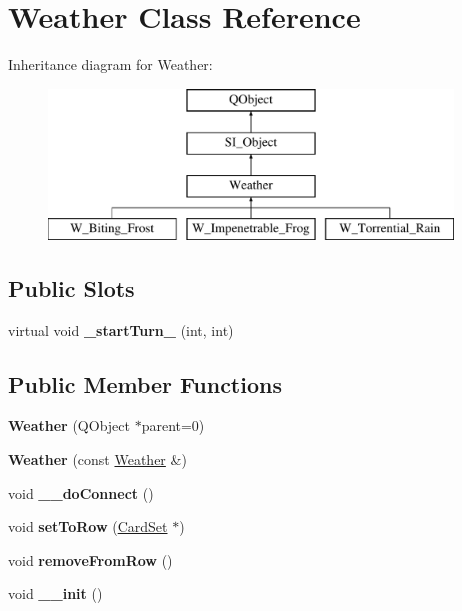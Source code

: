 \hypertarget{class_weather}{}\section{Weather Class Reference}
\label{class_weather}
Inheritance diagram for Weather\+:\begin{figure}[H]
\begin{center}
\leavevmode
\includegraphics[height=4.000000cm]{class_weather}
\end{center}
\end{figure}
\subsection*{Public Slots}
\begin{DoxyCompactItemize}
\item 
\mbox{\label{class_weather_a71873b46a578c3056113ce306de8d34e}} 
virtual void {\bfseries \+\_\+start\+Turn\+\_\+} (int, int)
\end{DoxyCompactItemize}
\subsection*{Public Member Functions}
\begin{DoxyCompactItemize}
\item 
\mbox{\label{class_weather_a1aa40de6a7c41ad78d2d64cbf9b43ba0}} 
{\bfseries Weather} (Q\+Object $\ast$parent=0)
\item 
\mbox{\label{class_weather_aa2bcf44c4341922b806aaa4b5839003c}} 
{\bfseries Weather} (const \hyperlink{class_weather}{Weather} \&)
\item 
\mbox{\label{class_weather_a565411dad19031111d17b4a89770491a}} 
void {\bfseries \+\_\+\+\_\+do\+Connect} ()
\item 
\mbox{\label{class_weather_a7bcdf5987eee6f28e8e3ea4bf6558602}} 
void {\bfseries set\+To\+Row} (\hyperlink{class_card_set}{Card\+Set} $\ast$)
\item 
\mbox{\label{class_weather_a3b5578263e2c356e25dd49dd3582ac17}} 
void {\bfseries remove\+From\+Row} ()
\item 
\mbox{\label{class_weather_af777d66f1dfa7587345e67c41d2d4bf2}} 
void {\bfseries \+\_\+\+\_\+init} ()
\end{DoxyCompactItemize}

